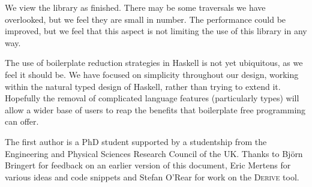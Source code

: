 \documentclass[preprint]{sigplanconf}
\begin{document}
We view the library as finished. There may be some traversals we have overlooked, but we feel they are small in number. The performance could be improved, but we feel that this aspect is not limiting the use of this library in any way.

The use of boilerplate reduction strategies in Haskell is not yet ubiquitous, as we feel it should be. We have focused on simplicity throughout our design, working within the natural typed design of Haskell, rather than trying to extend it. Hopefully the removal of complicated language features (particularly types) will allow a wider base of users to reap the benefits that boilerplate free programming can offer.

\acks

The first author is a PhD student supported by a studentship from the Engineering and Physical Sciences Research Council of the UK. Thanks to Bj\"{o}rn Bringert for feedback on an earlier version of this document, Eric Mertens for various ideas and code snippets and Stefan O'Rear for work on the \textsc{Derive} tool.



\end{document}
